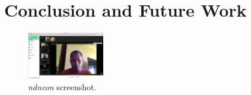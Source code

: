 \documentclass{icn/sig-alternate-2013} %
\newcommand{\ndnconName}{\emph{ndncon}}
\begin{document}
\section{Conclusion and Future Work}
\label{sec:conclusion}

\begin{figure}[t!]
\centering
\includegraphics[width=0.3\textwidth]{ndncon}
\caption{\ndnconName{} screenshot.}
\label{fig:ndncon}
\end{figure}

\end{document}
